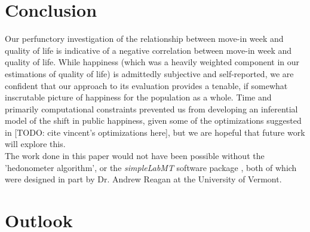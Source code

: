 \documentclass[journal, a4paper]{IEEEtran}
\begin{document}
\section{Conclusion}
Our perfunctory investigation of the relationship between move-in week and quality of life is indicative of a negative correlation between move-in week and quality of life. While happiness (which was a heavily weighted component in our estimations of quality of life) is admittedly subjective and self-reported, we are confident that our approach to its evaluation provides a tenable, if somewhat inscrutable picture of happiness for the population as a whole. Time and primarily computational constraints prevented us from developing an inferential model of the shift in public happiness, given some of the optimizations suggested in [TODO: cite vincent's optimizations here], but we are hopeful that future work will explore this.
\\The work done in this paper would not have been possible without the 'hedonometer algorithm', or the \textit{simpleLabMT} software package \cite{simplelabmt},  both of which were designed in part by Dr. Andrew Reagan at the University of Vermont.
\section{Outlook}
\end{document}
